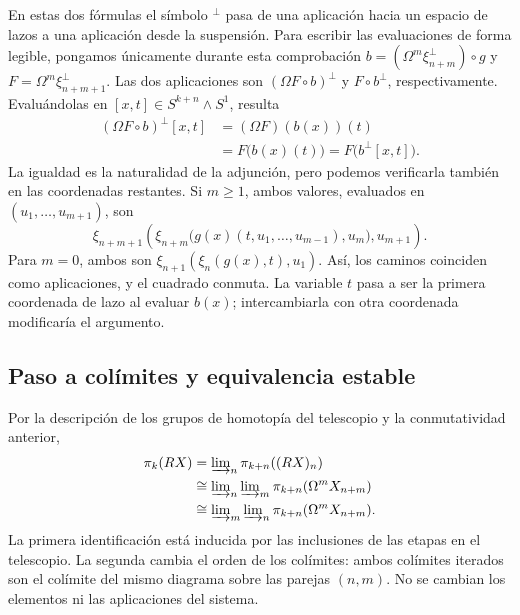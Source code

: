 En estas dos fórmulas el símbolo ${}^{\perp}$ pasa de una aplicación hacia un espacio de lazos a una aplicación desde la suspensión. Para escribir las evaluaciones de forma legible, pongamos únicamente durante esta comprobación $b=(\Omega^m\xi_{n+m}^{\perp})\circ g$ y $F=\Omega^m\xi_{n+m+1}^{\perp}$. Las dos aplicaciones son $(\Omega F\circ b)^{\perp}$ y $F\circ b^{\perp}$, respectivamente. Evaluándolas en $[x,t]\in S^{k+n}\wedge S^1$, resulta
\[
\begin{aligned}
(\Omega F\circ b)^{\perp}[x,t]
&=(\Omega F)(b(x))(t)\\
&=F\bigl(b(x)(t)\bigr)
=F\bigl(b^{\perp}[x,t]\bigr).
\end{aligned}
\]
La igualdad es la naturalidad de la adjunción, pero podemos verificarla también en las coordenadas restantes. Si $m\ge1$, ambos valores, evaluados en $(u_1,\ldots,u_{m+1})$, son
\[
\xi_{n+m+1}\!\left(
\xi_{n+m}\bigl(g(x)(t,u_1,\ldots,u_{m-1}),u_m\bigr),
u_{m+1}\right).
\]
Para $m=0$, ambos son $\xi_{n+1}(\xi_n(g(x),t),u_1)$. Así, los caminos coinciden como aplicaciones, y el cuadrado conmuta. La variable $t$ pasa a ser la primera coordenada de lazo al evaluar $b(x)$; intercambiarla con otra coordenada modificaría el argumento.

\subsection{Paso a colímites y equivalencia estable}

Por la descripción de los grupos de homotopía del telescopio y la conmutatividad anterior,
\[
\begin{aligned}
\pi_k(RX)
&=\varinjlim\nolimits_n\pi_{k+n}((RX)_n)\\
&\cong\varinjlim\nolimits_n\varinjlim\nolimits_m
\pi_{k+n}(\Omega^mX_{n+m})\\
&\cong\varinjlim\nolimits_m\varinjlim\nolimits_n
\pi_{k+n}(\Omega^mX_{n+m}).
\end{aligned}
\]
La primera identificación está inducida por las inclusiones de las etapas en el telescopio. La segunda cambia el orden de los colímites: ambos colímites iterados son el colímite del mismo diagrama sobre las parejas $(n,m)$. No se cambian los elementos ni las aplicaciones del sistema.

